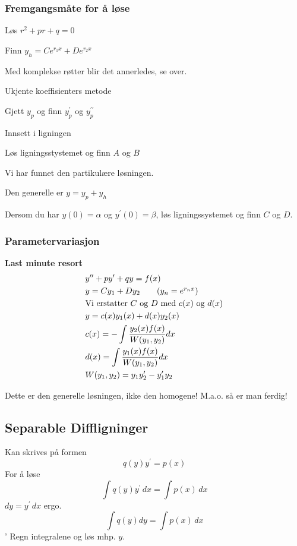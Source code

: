 \documentclass[defaultpackages]{cheatsheet}
\begin{document}
\subsubsection{Fremgangsmåte for å løse}
\begin{compactitem}
	\item Løs $r^2 + pr + q = 0$
	\item Finn $y_h = Ce^{r_1x}+De^{r_2x}$
	\item Med komplekse røtter blir det annerledes, se over.
	\item Ukjente koeffisienters metode
	\item Gjett $y_p$ og finn $y_p^\prime$ og $y_p^{\prime\prime}$
	\item Innsett i ligningen
	\item Løs ligningsstystemet og finn $A$ og $B$
	\item Vi har funnet den partikulære løsningen.
	\item Den generelle er $y=y_p+y_h$
	\item Dersom du har $y(0)=\alpha$ og $y^\prime (0) = \beta$, løs ligningssystemet og finn $C$ og $D$.
\end{compactitem}
\subsubsection{Parametervariasjon}
\textbf{Last minute resort}
\begin{align*}
	&y^{\prime\prime} + py^\prime + qy = f(x)\\
	& y = Cy_1 + Dy_2  \tag{$y_n = e^{r_nx}$}\\
	& \text{Vi erstatter $C$ og $D$ med $c(x)$ og $d(x)$}\\
	& y = c(x)y_1(x)+d(x)y_2(x)\\
	& c(x) = - \int \frac{y_2(x)f(x)}{W(y_1,y_2)} dx\\
	& d(x) = \int \frac{y_1(x)f(x)}{W(y_1,y_2)} dx\\
	& W(y_1, y_2) = y_1y_2^\prime - y_1^\prime y_2
\end{align*}

Dette er den generelle løsningen, ikke den homogene! M.a.o. så er man ferdig!

\subsection{Separable Diffligninger}
Kan skrives på formen
\[q(y)y^\prime = p(x)\]
For å løse
\[\int q(y)y^\prime \, dx = \int p(x)\,dx\]
$dy=y^\prime\,dx$ ergo.
\[\int q(y) dy = \int p(x)\,dx\]'
Regn integralene og løs mhp. $y$.
\end{document}
